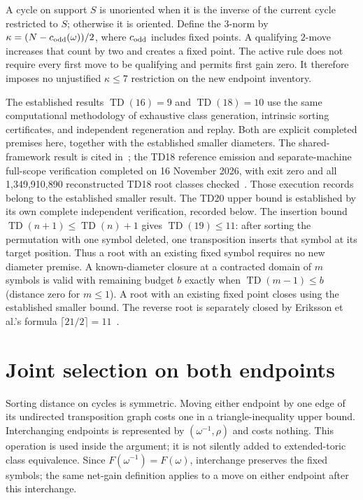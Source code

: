 \documentclass[11pt,a4paper]{article}
\newcommand{\TD}{\operatorname{TD}}
\begin{document}
A cycle on support $S$ is unoriented when it is the inverse of the current
cycle restricted to $S$; otherwise it is oriented. Define the $3$-norm by
$\kappa=(N-c_{\rm odd}(\omega))/2$, where $c_{\rm odd}$ includes fixed points.
A qualifying $2$-move increases that count by two and creates a fixed point.
The active rule does not require every first move to be qualifying and permits
first gain zero. It therefore imposes no unjustified $\kappa\leq7$ restriction
on the new endpoint inventory.

The established results $\TD(16)=9$ and $\TD(18)=10$ use the same
computational methodology of exhaustive class generation, intrinsic sorting
certificates, and independent regeneration and replay. Both are explicit
completed premises here, together with the established smaller diameters.
The shared-framework result is cited in~\cite{framework}; the TD18 reference
emission and separate-machine full-scope verification completed on
16 November 2026, with exit zero and all 1,349,910,890 reconstructed TD18
root classes checked~\cite{td18-reference}. Those execution records belong
to the established smaller result. The TD20 upper bound is established by its
own complete independent verification, recorded below.
The insertion bound $\TD(n+1)\leq\TD(n)+1$ gives $\TD(19)\leq11$: after sorting the permutation with one symbol deleted, one transposition inserts that symbol at its target position. Thus a root with an existing fixed symbol requires no new diameter premise.
A known-diameter closure at a contracted domain of $m$ symbols is valid with
remaining budget $b$ exactly when $\TD(m-1)\leq b$ (distance zero for $m\leq1$).
A root with an existing fixed point closes using the established smaller bound.
The reverse root is separately closed by Eriksson et al.'s formula
$\lceil 21/2\rceil=11$~\cite{eriksson}.

\section{Joint selection on both endpoints}
Sorting distance on cycles is symmetric. Moving either endpoint by one edge
of its undirected transposition graph costs one in a triangle-inequality upper
bound. Interchanging endpoints is represented by $(\omega^{-1},\rho)$ and
costs nothing. This operation is used inside the argument; it is not silently
added to extended-toric class equivalence. Since
$F(\omega^{-1})=F(\omega)$, interchange preserves the fixed symbols; the same
net-gain definition applies to a move on either endpoint after this interchange.
\end{document}
